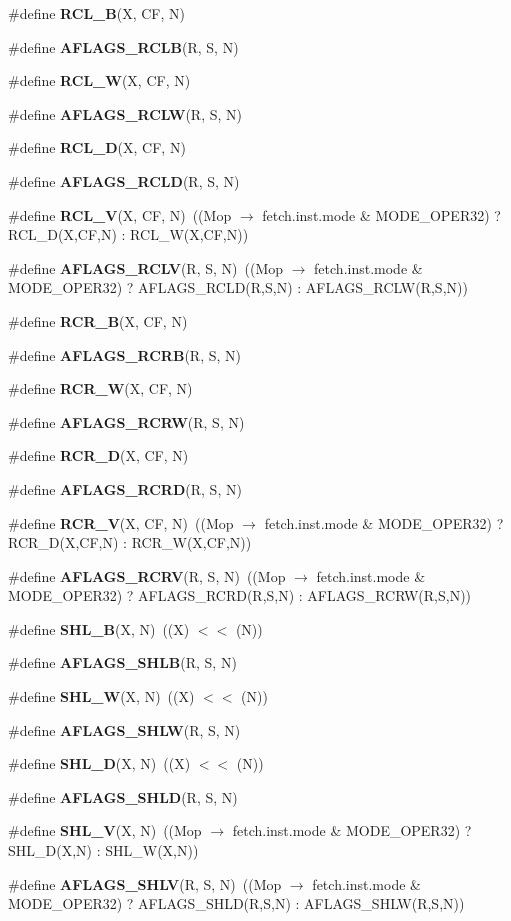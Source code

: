 \begin{CompactItemize}
\item 
\#define {\bf RCL\_\-B}(X, CF, N)
\item 
\#define {\bf AFLAGS\_\-RCLB}(R, S, N)
\item 
\#define {\bf RCL\_\-W}(X, CF, N)
\item 
\#define {\bf AFLAGS\_\-RCLW}(R, S, N)
\item 
\#define {\bf RCL\_\-D}(X, CF, N)
\item 
\#define {\bf AFLAGS\_\-RCLD}(R, S, N)
\item 
\#define {\bf RCL\_\-V}(X, CF, N)~((Mop $\rightarrow$ fetch.inst.mode \& MODE\_\-OPER32) ? RCL\_\-D(X,CF,N) : RCL\_\-W(X,CF,N))
\item 
\#define {\bf AFLAGS\_\-RCLV}(R, S, N)~((Mop $\rightarrow$ fetch.inst.mode \& MODE\_\-OPER32) ? AFLAGS\_\-RCLD(R,S,N) : AFLAGS\_\-RCLW(R,S,N))
\item 
\#define {\bf RCR\_\-B}(X, CF, N)
\item 
\#define {\bf AFLAGS\_\-RCRB}(R, S, N)
\item 
\#define {\bf RCR\_\-W}(X, CF, N)
\item 
\#define {\bf AFLAGS\_\-RCRW}(R, S, N)
\item 
\#define {\bf RCR\_\-D}(X, CF, N)
\item 
\#define {\bf AFLAGS\_\-RCRD}(R, S, N)
\item 
\#define {\bf RCR\_\-V}(X, CF, N)~((Mop $\rightarrow$ fetch.inst.mode \& MODE\_\-OPER32) ? RCR\_\-D(X,CF,N) : RCR\_\-W(X,CF,N))
\item 
\#define {\bf AFLAGS\_\-RCRV}(R, S, N)~((Mop $\rightarrow$ fetch.inst.mode \& MODE\_\-OPER32) ? AFLAGS\_\-RCRD(R,S,N) : AFLAGS\_\-RCRW(R,S,N))
\item 
\#define {\bf SHL\_\-B}(X, N)~((X) $<$$<$ (N))
\item 
\#define {\bf AFLAGS\_\-SHLB}(R, S, N)
\item 
\#define {\bf SHL\_\-W}(X, N)~((X) $<$$<$ (N))
\item 
\#define {\bf AFLAGS\_\-SHLW}(R, S, N)
\item 
\#define {\bf SHL\_\-D}(X, N)~((X) $<$$<$ (N))
\item 
\#define {\bf AFLAGS\_\-SHLD}(R, S, N)
\item 
\#define {\bf SHL\_\-V}(X, N)~((Mop $\rightarrow$ fetch.inst.mode \& MODE\_\-OPER32) ? SHL\_\-D(X,N) : SHL\_\-W(X,N))
\item 
\#define {\bf AFLAGS\_\-SHLV}(R, S, N)~((Mop $\rightarrow$ fetch.inst.mode \& MODE\_\-OPER32) ? AFLAGS\_\-SHLD(R,S,N) : AFLAGS\_\-SHLW(R,S,N))
$$
\end{CompactItemize}
